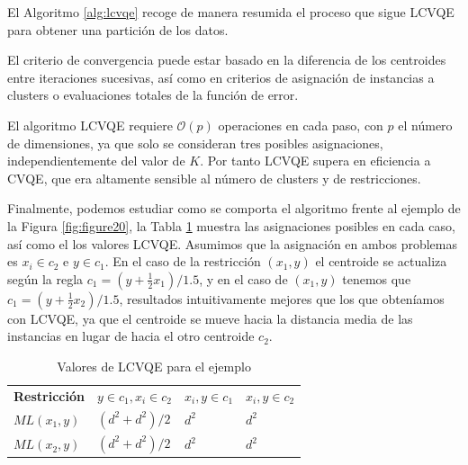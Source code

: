El Algoritmo \ref{alg:lcvqe} recoge de manera resumida el proceso que sigue \acs{LCVQE} para obtener una partición de los datos. 

El criterio de convergencia puede estar basado en la diferencia de los centroides entre iteraciones sucesivas, así como en criterios de asignación de instancias a clusters o evaluaciones totales de la función de error.

El algoritmo \acs{LCVQE} requiere $\mathcal{O}(p)$ operaciones en cada paso, con $p$ el número de dimensiones, ya que solo se consideran tres posibles asignaciones, independientemente del valor de $K$. Por tanto \acs{LCVQE} supera en eficiencia a \acs{CVQE}, que era altamente sensible al número de clusters y de restricciones.

Finalmente, podemos estudiar como se comporta el algoritmo frente al ejemplo de la Figura \ref{fig:figure20}, la Tabla \ref{tab:tabla4} muestra las asignaciones posibles en cada caso, así como el los valores \acs{LCVQE}. Asumimos que la asignación en ambos problemas es $x_i \in c_2$ e $y \in c_1$. En el caso de la restricción $(x_1, y)$ el centroide se actualiza según la regla $c_1 = (y + \frac{1}{2}x_1)/1.5$, y en el caso de $(x_1, y)$ tenemos que $c_1 = (y + \frac{1}{2}x_2)/1.5$, resultados intuitivamente mejores que los que obteníamos con \acs{LCVQE}, ya que el centroide se mueve hacia la distancia media de las instancias en lugar de hacia el otro centroide $c_2$.

\begin{table}[!h]
	\centering
	\setlength{\arrayrulewidth}{1mm}
	\setlength{\tabcolsep}{10pt}
	\renewcommand{\arraystretch}{1}
	
	\begin{tabular}{ >{\centering\arraybackslash}m{2cm}  >{\centering\arraybackslash}m{2.5cm}>{\centering\arraybackslash}m{2cm}>{\centering\arraybackslash}m{2cm}}
		\hline
		\rowcolor{black}
		\multicolumn{4}{c}{\bf \color{white}{Valores de LCVQE}}\\
		\hline
		\rowcolor{gray!50}
		\textbf{Restricción} & \textbf{$y \in c_1, x_i \in c_2$} & \textbf{$x_i,y \in c_1$} & \textbf{$x_i,y \in c_2$}  \\
		$ML(x_1, y)$ & $(d^2 + d^2)/2$ & $d^2$ & $d^2$  \\
		$ML(x_2, y)$  & $(d^2 + d^2)/2$ & $d^2$ & $d^2$ \\
		\hline
		
	\end{tabular}
	\caption[Valores de LCVQE para el ejemplo]{Valores de LCVQE para el ejemplo \cite{CECM:2012}}
	\label{tab:tabla4}
\end{table}

